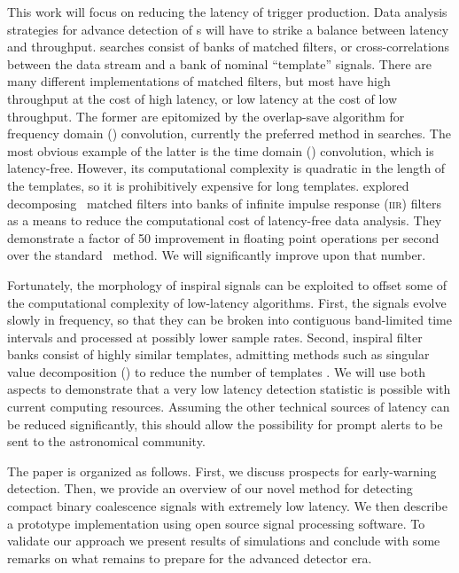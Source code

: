 This work will focus on reducing the latency of trigger production.  Data analysis
strategies for advance detection of \CBC{}s will have to strike a balance between latency
and throughput. \CBC{} searches consist of banks of
matched filters, or cross-correlations between the data stream and a bank of
nominal ``template'' signals.  There are many different implementations of
matched filters, but most have high throughput at the cost of high latency, or
low latency at the cost of low throughput.  The former are epitomized by the
overlap-save algorithm for frequency domain (\FD) convolution, currently the
preferred method in \GW{} searches.  The most obvious example of the latter is
the time domain (\TD) convolution, which is latency-free.  However, its
computational complexity is quadratic in the length of the templates, so it is
prohibitively expensive for long templates.  \citet{shaunIIR} explored decomposing
\CBC\ matched filters into banks of infinite impulse response (\textsc{iir})
filters as a means to reduce the computational cost of latency-free data analysis.  They
demonstrate a factor of 50 improvement in floating point operations per second
over the standard \TD\ method.  We will significantly improve upon that number.

Fortunately, the morphology of inspiral signals can be exploited to offset some
of the computational complexity of low-latency algorithms.  First, the signals
evolve slowly in frequency, so that they can be broken into contiguous
band-limited time intervals and processed at possibly lower sample rates.
Second, inspiral filter banks consist of highly similar templates, admitting
methods such as singular value decomposition (\SVD{}) to reduce the number of
templates \citep{Cannon:2010p10398}. We will use both aspects to demonstrate
that a very low latency detection statistic is possible with current computing
resources.  Assuming the other technical sources of latency can be reduced
significantly, this should allow the possibility for prompt alerts to be sent
to the astronomical community.

The paper is organized as follows.  First, we discuss prospects for early-warning
detection.  Then, we provide an overview of our novel method for detecting compact
binary coalescence signals with extremely low latency. We then describe a prototype
implementation using open source signal processing software.  To validate our approach
we present results of simulations and conclude with some remarks on what remains to
prepare for the advanced detector era.
